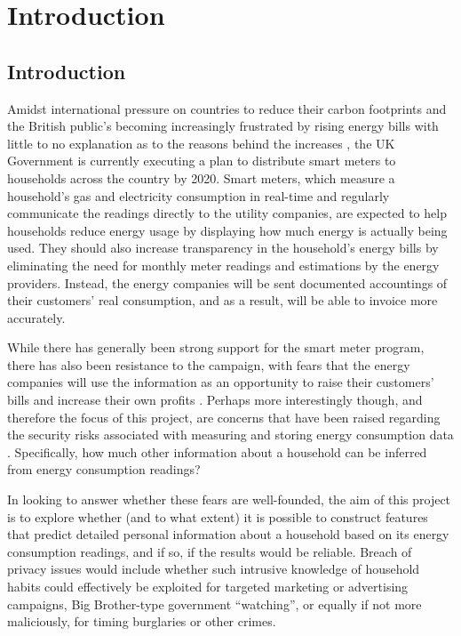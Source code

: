 \chapter{Introduction}
\section{Introduction}
Amidst international pressure on countries to reduce their carbon footprints \cite{E_spending} and the British public's becoming increasingly frustrated by rising energy bills with little to no explanation as to the reasons behind the increases \cite{E_spending}, the UK Government is currently executing a plan to distribute smart meters to households across the country by 2020. Smart meters, which measure a household's gas and electricity consumption in real-time and regularly communicate the readings  directly to the utility companies, are expected to help households reduce energy usage by displaying how much energy is actually being used. They should also increase transparency in the household's energy bills by eliminating the need for monthly meter readings and estimations by the energy providers. Instead, the energy companies will be sent documented accountings of their customers' real consumption, and as a result, will be able to invoice more accurately.

While there has generally been strong support for the smart meter program, there has also been resistance to the campaign, with fears that the energy companies will use the information as an opportunity to raise their customers' bills and increase their own profits \cite{stop}. Perhaps more interestingly though, and therefore the focus of this project, are concerns that have been raised regarding the security risks associated with measuring and storing energy consumption data \cite{Quinn} \cite{LMW}. Specifically, how much other information about a household can be inferred from energy consumption readings? 

In looking to answer whether these fears are well-founded, the aim of this project is to explore whether (and to what extent) it is
possible to construct features that predict detailed personal information about a household based on its energy consumption readings, and if so, if the results would be reliable. Breach of privacy issues would include whether such intrusive knowledge of household habits could effectively be exploited for targeted marketing or advertising campaigns, Big Brother-type government “watching”, or equally if not more maliciously, for timing burglaries or other crimes. 


